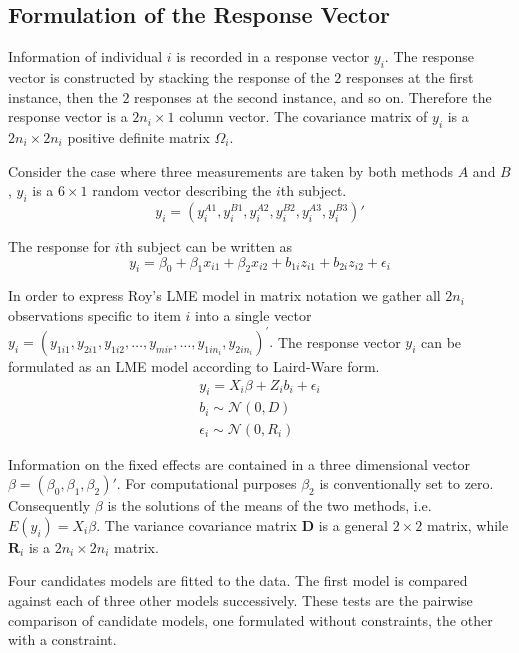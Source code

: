 \documentclass[12pt, a4paper]{report}
\theoremstyle{plain}
\theoremstyle{definition}
\theoremstyle{remark}
\begin{document}
	
	\subsection{Formulation of the Response Vector}
	Information of individual $i$ is recorded in a response vector ${y}_{i}$. The response vector is constructed by stacking the response of the $2$ responses at the first instance, then the $2$ responses at the second instance, and so on. Therefore the response vector is a $2n_{i} \times 1$ column vector.
	The covariance matrix of ${y_{i}}$ is a $2n_{i} \times 2n_{i}$ positive definite matrix ${\Omega}_{i}$.
	
	Consider the case where three measurements are taken by both methods $A$ and $B$, ${y}_{i}$ is a $6 \times 1$ random vector describing the $i$th subject.
	\[
	{y}_{i} = (y_{i}^{A1},y_{i}^{B1},y_{i}^{A2},y_{i}^{B2},y_{i}^{A3},y_{i}^{B3}) \prime
	\]
	
	The response for $i$th subject can be written as
	\[ y_i = \beta_0 + \beta_1x_{i1} + \beta_2x_{i2} + b_{1i}z_{i1}  + b_{2i}z_{i2} + \epsilon_i \]
	
	In order to express Roy's LME model in matrix notation we gather all $2n_i$ observations specific to item $i$ into a single vector  ${y}_{i} = (y_{1i1},y_{2i1},y_{1i2},\ldots,y_{mir},\ldots,y_{1in_{i}},y_{2in_{i}})^\prime.$
	The response vector ${y_{i}}$ can be formulated as an LME model according to Laird-Ware form.
	\begin{eqnarray*}
		{y_{i}} = {X_{i}\beta}  + {Z_{i}b_{i}} + {\epsilon_{i}}\\
		{b_{i}} \sim \mathcal{N}({0,D})\\
		{\epsilon_{i}} \sim \mathcal{N}({0,R_{i}})
	\end{eqnarray*}
	
	Information on the fixed effects are contained in a three dimensional vector ${\beta} = (\beta_{0},\beta_{1},\beta_{2})\prime$. For computational purposes $\beta_{2}$ is conventionally set to zero. Consequently ${\beta}$ is the solutions of the means of the two methods, i.e. $E({y}_{i})  = {X}_{i}{\beta}$. The variance covariance matrix $\boldsymbol{D}$ is a general $2 \times 2$ matrix, while $\boldsymbol{R}_{i}$ is a $2n_{i} \times 2n_{i}$ matrix.
	
	Four candidates models are fitted to the data. The first model is compared against each of three other models successively. These tests are the pairwise comparison of candidate models, one formulated without constraints, the other with a constraint.
	
\end{document}
